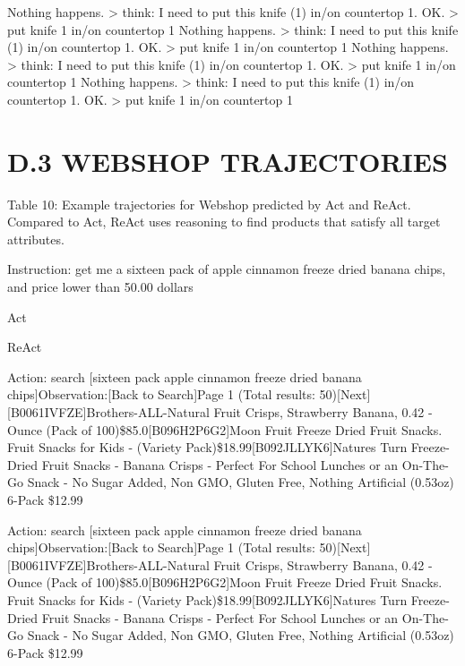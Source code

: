 \documentclass[
]{article}
\newenvironment{Shaded}{}{}
\newcommand{\NormalTok}[1]{#1}
\begin{document}
\begin{Shaded}
\begin{Highlighting}[]
\NormalTok{Nothing happens.}
\NormalTok{\textgreater{} think: I need to put this knife (1) in/on countertop 1.}
\NormalTok{OK.}
\NormalTok{\textgreater{} put knife 1 in/on countertop 1}
\NormalTok{Nothing happens.}
\NormalTok{\textgreater{} think: I need to put this knife (1) in/on countertop 1.}
\NormalTok{OK.}
\NormalTok{\textgreater{} put knife 1 in/on countertop 1}
\NormalTok{Nothing happens.}
\NormalTok{\textgreater{} think: I need to put this knife (1) in/on countertop 1.}
\NormalTok{OK.}
\NormalTok{\textgreater{} put knife 1 in/on countertop 1}
\NormalTok{Nothing happens.}
\NormalTok{\textgreater{} think: I need to put this knife (1) in/on countertop 1.}
\NormalTok{OK.}
\NormalTok{\textgreater{} put knife 1 in/on countertop 1 }
\end{Highlighting}
\end{Shaded}

\section{D.3 WEBSHOP TRAJECTORIES}\label{d.3-webshop-trajectories}

Table 10: Example trajectories for Webshop predicted by Act and ReAct.
Compared to Act, ReAct uses reasoning to find products that satisfy all
target attributes.

Instruction: get me a sixteen pack of apple cinnamon freeze dried banana
chips, and price lower than 50.00 dollars

Act

ReAct

Action: search {[}sixteen pack apple cinnamon freeze dried banana
chips{]}Observation:{[}Back to Search{]}Page 1 (Total results:
50){[}Next{]}{[}B0061IVFZE{]}Brothers-ALL-Natural Fruit Crisps,
Strawberry Banana, 0.42 - Ounce (Pack of 100)\$85.0{[}B096H2P6G2{]}Moon
Fruit Freeze Dried Fruit Snacks. Fruit Snacks for Kids - (Variety
Pack)\$18.99{[}B092JLLYK6{]}Nature\textquotesingle s Turn Freeze-Dried
Fruit Snacks - Banana Crisps - Perfect For School Lunches or an
On-The-Go Snack - No Sugar Added, Non GMO, Gluten Free, Nothing
Artificial (0.53oz) 6-Pack \$12.99

Action: search {[}sixteen pack apple cinnamon freeze dried banana
chips{]}Observation:{[}Back to Search{]}Page 1 (Total results:
50){[}Next{]}{[}B0061IVFZE{]}Brothers-ALL-Natural Fruit Crisps,
Strawberry Banana, 0.42 - Ounce (Pack of 100)\$85.0{[}B096H2P6G2{]}Moon
Fruit Freeze Dried Fruit Snacks. Fruit Snacks for Kids - (Variety
Pack)\$18.99{[}B092JLLYK6{]}Nature\textquotesingle s Turn Freeze-Dried
Fruit Snacks - Banana Crisps - Perfect For School Lunches or an
On-The-Go Snack - No Sugar Added, Non GMO, Gluten Free, Nothing
Artificial (0.53oz) 6-Pack \$12.99
\end{document}
